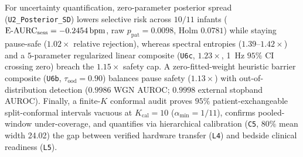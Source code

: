 {For uncertainty quantification, zero-parameter posterior spread
(\texttt{U2\_\allowbreak Posterior\_\allowbreak SD}) lowers selective risk across $10/11$
infants ($\mathrm{E\text{-}AURC}_{\mathrm{sess}}=-0.2454\,\mathrm{bpm}$, raw $p_{\mathrm{pat}}=0.0098$,
Holm $0.0781$) while staying pause-safe ($1.02\times$ relative rejection), whereas spectral
entropies ($1.39\text{--}1.42\times$) and a $5$-parameter regularized linear composite
(\texttt{U6c}, $1.23\times$, \SI{1}{\hertz} $95\%$ CI crossing zero) breach the $1.15\times$
safety cap. A zero-fitted-weight heuristic barrier composite (\texttt{U6b},
$\tau_{\mathrm{ood}}=0.90$) balances pause safety ($1.13\times$) with out-of-distribution
detection ($0.9986$ WGN AUROC; $0.9998$ external stopband AUROC). Finally, a finite-$K$ conformal
audit proves $95\%$ patient-exchangeable split-conformal intervals vacuous at $K_{\mathrm{cal}}=10$
($\alpha_{\min}=1/11$), confirms pooled-window under-coverage, and quantifies via hierarchical
calibration (\texttt{C5}, $80\%$ mean width \SI{24.02}{\bpm}) the gap between verified hardware
transfer (\texttt{L4}) and bedside clinical readiness (\texttt{L5}).
\par}

\cleardoublepage
